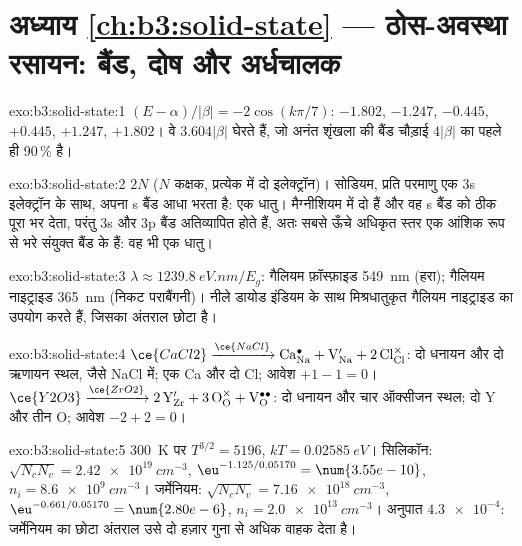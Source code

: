 \section*{अध्याय \ref{ch:b3:solid-state} --- ठोस-अवस्था रसायन: बैंड, दोष और अर्धचालक}

\begin{solution}{exo:b3:solid-state:1}
$(E - \alpha)/|\beta| = -2\cos(k\pi/7)$: $-1.802$, $-1.247$, $-0.445$, $+0.445$, $+1.247$, $+1.802$। वे
$3.604|\beta|$ घेरते हैं, जो अनंत शृंखला की बैंड चौड़ाई $4|\beta|$ का पहले ही 90\,\% है।
\end{solution}

\begin{solution}{exo:b3:solid-state:2}
$2N$ ($N$ कक्षक, प्रत्येक में दो इलेक्ट्रॉन)। सोडियम, प्रति परमाणु एक 3s इलेक्ट्रॉन के साथ, अपना s बैंड
आधा भरता है: एक धातु। मैग्नीशियम में दो हैं और वह s बैंड को ठीक पूरा भर देता,
परंतु 3s और 3p बैंड अतिव्यापित होते हैं, अतः सबसे ऊँचे अधिकृत स्तर एक
आंशिक रूप से भरे संयुक्त बैंड के हैं: वह भी एक धातु।
\end{solution}

\begin{solution}{exo:b3:solid-state:3}
$\lambda \approx \qty{1239.8}{eV.nm}/E_g$: गैलियम फ़ॉस्फ़ाइड \qty{549}{nm} (हरा); गैलियम नाइट्राइड \qty{365}{nm}
(निकट पराबैंगनी)। नीले डायोड इंडियम के साथ मिश्रधातुकृत गैलियम नाइट्राइड का उपयोग करते हैं, जिसका
अंतराल छोटा है।
\end{solution}

\begin{solution}{exo:b3:solid-state:4}
$\ce{CaCl2} \xrightarrow{\ce{NaCl}} \mathrm{Ca_{Na}^{\bullet} + V_{Na}' + 2\,Cl_{Cl}^{\times}}$: दो धनायन और दो ऋणायन स्थल, जैसे NaCl में; एक Ca और
दो Cl; आवेश $+1 - 1 = 0$। $\ce{Y2O3} \xrightarrow{\ce{ZrO2}} \mathrm{2\,Y_{Zr}' + 3\,O_O^{\times} + V_O^{\bullet\bullet}}$: दो धनायन और चार ऑक्सीजन स्थल; दो Y
और तीन O; आवेश $-2 + 2 = 0$।
\end{solution}

\begin{solution}{exo:b3:solid-state:5}
\qty{300}{K} पर $T^{3/2} = 5196$, $kT = \qty{0.02585}{eV}$। सिलिकॉन: $\sqrt{N_cN_v} = \qty{2.42e19}{cm^{-3}}$, $\eu^{-1.125/0.05170} = \num{3.55e-10}$,
$n_i = \qty{8.6e9}{cm^{-3}}$। जर्मेनियम: $\sqrt{N_cN_v} = \qty{7.16e18}{cm^{-3}}$, $\eu^{-0.661/0.05170} = \num{2.80e-6}$, $n_i = \qty{2.0e13}{cm^{-3}}$। अनुपात
$\num{4.3e-4}$: जर्मेनियम का छोटा अंतराल उसे दो हज़ार गुना से अधिक
वाहक देता है।
\end{solution}

